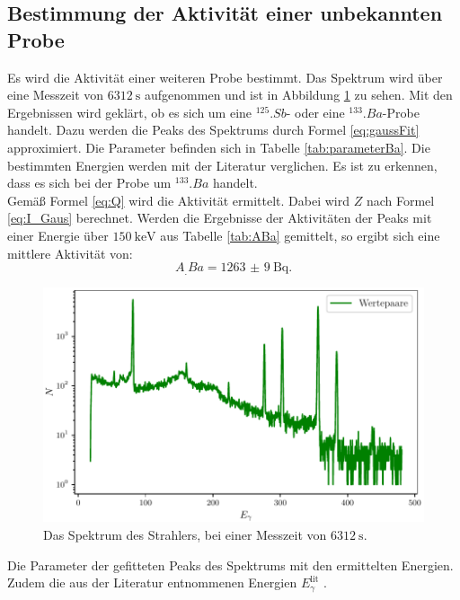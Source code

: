 \subsection{Bestimmung der Aktivität einer unbekannten Probe}

Es wird die Aktivität einer weiteren Probe bestimmt. Das Spektrum wird über eine Messzeit von $\SI{6312}{\second}$ aufgenommen und ist in Abbildung \ref{fig:Ba} zu sehen. Mit den Ergebnissen wird geklärt, ob es sich um eine $^{125}.{Sb}$- oder eine $^{133}.{Ba}$-Probe handelt.
Dazu werden die Peaks des Spektrums durch Formel \eqref{eq:gaussFit} approximiert. Die Parameter befinden sich in Tabelle \ref{tab:parameterBa}. Die bestimmten Energien werden mit der Literatur \cite{KHAZOV2011855} verglichen. Es ist zu erkennen, dass es sich bei der Probe um $^{133}.{Ba}$ handelt.\\
Gemäß Formel \eqref{eq:Q} wird die Aktivität ermittelt. Dabei wird $Z$ nach Formel \eqref{eq:I_Gaus} berechnet. Werden die Ergebnisse der Aktivitäten der Peaks mit einer Energie über $\SI{150}{\kilo\electronvolt}$ aus Tabelle \ref{tab:ABa} gemittelt, so ergibt sich eine mittlere Aktivität von:
\[
A_.{Ba} = \SI{1263(9)}{\becquerel}\text{.}
\]

\begin{figure}
	\centering
	\includegraphics[width=\linewidth-60pt,height=\textheight-60pt,keepaspectratio]{content/images/D.pdf}
	\caption{Das Spektrum des Strahlers, bei einer Messzeit von $\SI{6312}{\second}$.}
	\label{fig:Ba}
\end{figure}

\begin{table}
	\centering
	\caption{Die Parameter der gefitteten Peaks des Spektrums mit den ermittelten Energien. Zudem die aus der Literatur entnommenen Energien $E_\gamma^\text{lit}$ \cite{KHAZOV2011855}.}
	
	\label{tab:parameterBa}
\end{table}

